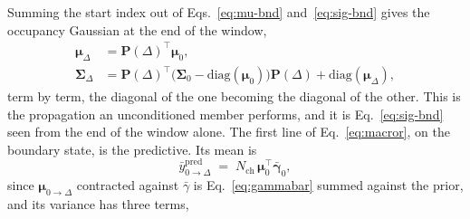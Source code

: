 Summing the start index out of Eqs.~\ref{eq:mu-bnd} and~\ref{eq:sig-bnd} gives the occupancy
Gaussian at the end of the window,
\begin{align}
  \bm{\mu}_\Delta &= \mathbf{P}(\Delta)^\top \bm{\mu}_0, \label{eq:mu-prop}\\
  \bm{\Sigma}_\Delta &= \mathbf{P}(\Delta)^\top\bigl(\bm{\Sigma}_0-\mathrm{diag}(\bm{\mu}_0)\bigr)\mathbf{P}(\Delta) + \mathrm{diag}(\bm{\mu}_\Delta), \label{eq:sig-prop}
\end{align}
term by term, the diagonal of the one becoming the diagonal of the other. This is the
propagation an unconditioned member performs, and it is Eq.~\ref{eq:sig-bnd} seen from the end
of the window alone.
The first line of Eq.~\ref{eq:macror}, on the boundary state, is the predictive. Its mean is
\begin{equation}
  \bar{y}^{\mathrm{pred}}_{0\to\Delta} \;=\; N_{\mathrm{ch}}\,\bm{\mu}_0^\top \bar{\bm{\gamma}}_0,
  \label{eq:ypred}
\end{equation}
since $\bm{\mu}_{0\to\Delta}$ contracted against $\bar{\gamma}$ is Eq.~\ref{eq:gammabar}
summed against the prior, and its variance has three terms,
